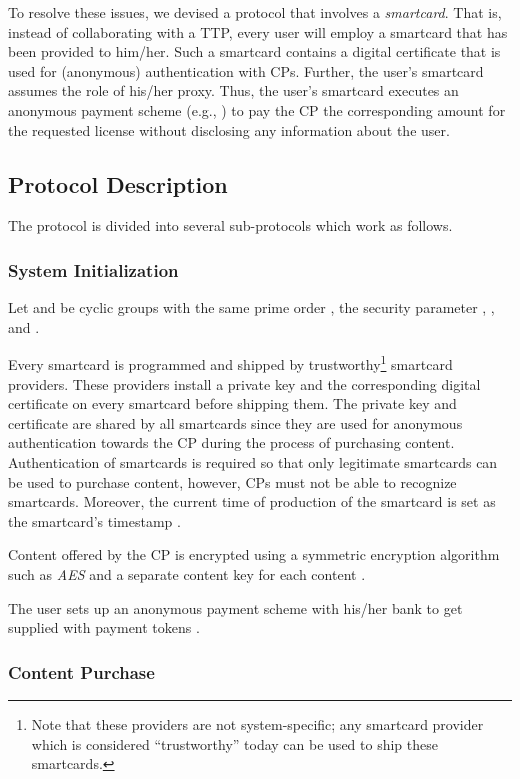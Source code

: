\documentclass{llncs}
\begin{document}
To resolve these issues, we devised a protocol that involves a \emph{smartcard}. That is, instead of collaborating with a TTP, every user will employ a smartcard that has been provided to him/her. Such a smartcard contains a digital certificate that is used for (anonymous) authentication with CPs. Further, the user's smartcard assumes the role of his/her proxy. Thus, the user's smartcard executes an anonymous payment scheme (e.g., \cite{Tewari1998}) to pay the CP the corresponding amount for the requested license without disclosing any information about the user.


\subsection{Protocol Description}

The protocol is divided into several sub-protocols which work as follows.

\subsubsection{System Initialization} \label{system_initialization}

Let  and  be cyclic groups with the same prime order , the security parameter , , and . 


Every smartcard is programmed and shipped by trustworthy\footnote{Note that these providers are not system-specific; any smartcard provider which is considered ``trustworthy'' today can be used to ship these smartcards.} smartcard providers. These providers install a private key  and the corresponding digital certificate  on every smartcard before shipping them. The private key and certificate are shared by all smartcards since they are used for anonymous authentication towards the CP during the process of purchasing content. Authentication of smartcards is required so that only legitimate smartcards can be used to purchase content, however, CPs must not be able to recognize smartcards. Moreover, the current time of production of the smartcard is set as the smartcard's timestamp .


Content offered by the CP is encrypted using a symmetric encryption algorithm such as \emph{AES} \cite{aes} and a separate content key  for each content . 

The user sets up an anonymous payment scheme with his/her bank to get supplied with payment tokens .

\subsubsection{Content Purchase} \label{content_purchase}
\end{document}
